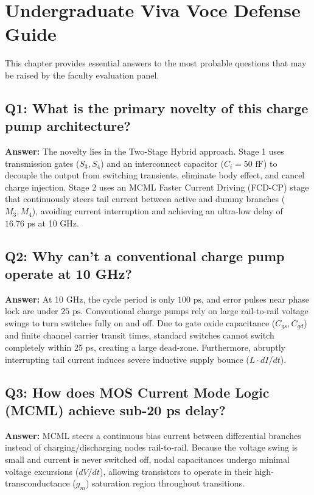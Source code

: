 \documentclass[11pt,a4paper]{report}
\begin{document}
\newpage

\chapter[Viva Voce Defense Guide]{Undergraduate Viva Voce Defense Guide}

This chapter provides essential answers to the most probable questions that may be raised by the faculty evaluation panel.

\section*{Q1: What is the primary novelty of this charge pump architecture?}
\textbf{Answer:} The novelty lies in the Two-Stage Hybrid approach. Stage 1 uses transmission gates ($S_3, S_4$) and an interconnect capacitor ($C_i = 50\text{ fF}$) to decouple the output from switching transients, eliminate body effect, and cancel charge injection. Stage 2 uses an MCML Faster Current Driving (FCD-CP) stage that continuously steers tail current between active and dummy branches ($M_3, M_4$), avoiding current interruption and achieving an ultra-low delay of $16.76\text{ ps}$ at 10 GHz.

\section*{Q2: Why can't a conventional charge pump operate at 10 GHz?}
\textbf{Answer:} At 10 GHz, the cycle period is only $100\text{ ps}$, and error pulses near phase lock are under $25\text{ ps}$. Conventional charge pumps rely on large rail-to-rail voltage swings to turn switches fully on and off. Due to gate oxide capacitance ($C_{gs}, C_{gd}$) and finite channel carrier transit times, standard switches cannot switch completely within 25 ps, creating a large dead-zone. Furthermore, abruptly interrupting tail current induces severe inductive supply bounce ($L \cdot dI/dt$).

\section*{Q3: How does MOS Current Mode Logic (MCML) achieve sub-20 ps delay?}
\textbf{Answer:} MCML steers a continuous bias current between differential branches instead of charging/discharging nodes rail-to-rail. Because the voltage swing is small and current is never switched off, nodal capacitances undergo minimal voltage excursions ($dV/dt$), allowing transistors to operate in their high-transconductance ($g_m$) saturation region throughout transitions.
\end{document}
